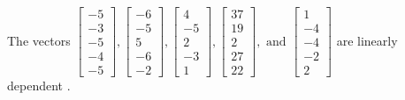 \begin{exercise}
\begin{exerciseStatement}
  \end{exerciseStatement}
  \begin{exerciseAnswer}
   The vectors \(\left[\begin{array}{r}
-5 \\
-3 \\
-5 \\
-4 \\
-5
\end{array}\right] , \left[\begin{array}{r}
-6 \\
-5 \\
5 \\
-6 \\
-2
\end{array}\right] , \left[\begin{array}{r}
4 \\
-5 \\
2 \\
-3 \\
1
\end{array}\right] , \left[\begin{array}{r}
37 \\
19 \\
2 \\
27 \\
22
\end{array}\right] , \text{ and } \left[\begin{array}{r}
1 \\
-4 \\
-4 \\
-2 \\
2
\end{array}\right]\) are 
  	 linearly dependent  .
  


  \end{exerciseAnswer}
\end{exercise}